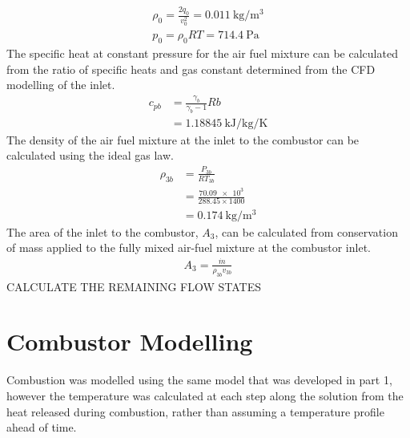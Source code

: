 \documentclass[a4paper]{article}
\begin{document}
\begin{gather}
    \rho_0 = \frac{2 q_0}{v_0^2} = \SI{0.011}{\kg\per\m\cubed} \\
    p_0 = \rho_0 R T = \SI{714.4}{\Pa}
\end{gather}
The specific heat at constant pressure for the air fuel mixture can be calculated from the ratio of specific heats and gas constant determined from the CFD modelling of the inlet.
\begin{align}
    c_{pb} &= \frac{\gamma_b}{\gamma_b - 1}Rb\\
    &= \SI{1.18845}{\kJ\per\kg\per\K}
\end{align}
The density of the air fuel mixture at the inlet to the combustor can be calculated using the ideal gas law.
\begin{align}
    \rho_{3b} &= \frac{P_{3b}}{RT_{3b}}\\
    &= \frac{\num{70.09e3}}{288.45 \times 1400}\\
    &= \SI{0.174}{\kg\per\m\cubed}
\end{align}
The area of the inlet to the combustor, \(A_3\), can be calculated from conservation of mass applied to the fully mixed air-fuel mixture at the combustor inlet.
\begin{align}
    A_3 = \frac{\dot{m}}{\rho_{3b} v_{3b}}
\end{align}
CALCULATE THE REMAINING FLOW STATES


\section{Combustor Modelling}
Combustion was modelled using the same model that was developed in part 1, however the temperature was calculated at each step along the solution from the heat released during combustion, rather than assuming a temperature profile ahead of time.
\end{document}
